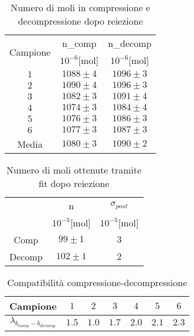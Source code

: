 \documentclass[a4paper,11pt,oneside]{article}
\begin{document}
\begin{table}[h!]
    \centering
    \begin{tabular}{|c|c|c|}
        \hline
        \multirow{2}{*}{Campione} & n_{comp} & n_{decomp}\\ 
        & $10^{-6}$[mol] & $10^{-6}$[mol]\\ \hline
        \rowcolor[rgb]{0.85,0.85,0.85}$1$ & $1088\pm4$ & $1096\pm3$\\ \hline
        $2$ & $1090\pm4$ & $1096\pm3$\\ \hline
        \rowcolor[rgb]{0.85,0.85,0.85}$3$ & $1082\pm3$ & $1091\pm4$\\ \hline
        $4$ & $1074\pm3$ & $1084\pm4$\\ \hline
        \rowcolor[rgb]{0.85,0.85,0.85}$5$ & $1076\pm3$ & $1086\pm3$\\ \hline	
        $6$ & $1077\pm3$ & $1087\pm3$\\ \hline
        \rowcolor[rgb]{0.85,0.85,0.85}Media & $1080\pm3$ & $1090\pm2$\\ \hline
    \end{tabular}
    \caption{Numero di moli in compressione e decompressione dopo reiezione}
    \label{tab:moli_compress_decompress_reiez}
\end{table}

\begin{table}[h!]
    \centering
    \begin{tabular}{|c|c|c|}
        \hline
        & n & $\sigma_{post}$\\
        & $10^{-5}$[mol] & $10^{-5}$[mol]\\ \hline
        \rowcolor[rgb]{0.85,0.85,0.85}Comp & $99\pm1$ & $3$\\ \hline
        Decomp & $102\pm1$ & $2$\\ \hline
    \end{tabular}
    \caption{Numero di moli ottenute tramite fit dopo reiezione}
    \label{tab:moli_fit_reiez}
\end{table}

\begin{table}[h!]
\centering
\begin{tabular}{|c|c|c|c|c|c|c|}
    \hline
    \textbf{Campione} & $1$ & $2$ & $3$ & $4$ & $5$ & $6$ \\ \hline
    \rowcolor[rgb]{0.85,0.85,0.85}$\lambda_{b_{comp}-b_{decomp}}$ & $1.5$ & $1.0$ & $1.7$ & $2.0$ & $2.1$ & $2.3$ \\ \hline
    \end{tabular}
\caption{Compatibilità compressione-decompressione}
\label{tab:compatibilita_coeff_ang_compress_decompress_nuovo}
\end{table}
\end{document}
